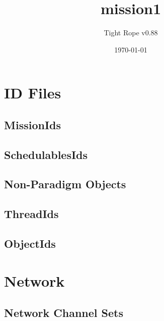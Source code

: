 \documentclass[10pt,a4paper]{article}
\title{mission1}
\author{Tight Rope v0.88}
\date{\today}
\begin{document}
\maketitle

\section{ID Files}
\subsection{MissionIds}

\newpage

\subsection{SchedulablesIds}

\newpage

\subsection{Non-Paradigm Objects}
\newpage

\subsection{ThreadIds}

\newpage

\subsection{ObjectIds}

\newpage

\section{Network}
\subsection{Network Channel Sets}




{}
\end{document}
